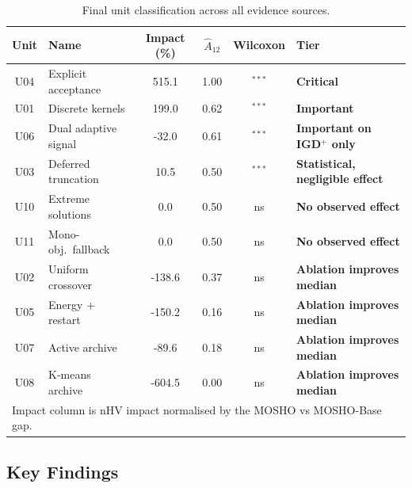 \documentclass[11pt,a4paper]{article}
\begin{document}
\begin{table}[H]
\centering
\caption{Final unit classification across all evidence sources.}
\label{tab:classification}
\renewcommand{\arraystretch}{1.3}
\setlength{\tabcolsep}{5pt}
\small
\begin{tabular}{c l c c c l}
\toprule
\textbf{Unit} & \textbf{Name} &
  \textbf{Impact (\%)} & $\hat{A}_{12}$ &
  \textbf{Wilcoxon} & \textbf{Tier} \\
\midrule
U04 & Explicit acceptance  & 515.1 & 1.00 & $^{***}$ & \textbf{Critical} \\
U01 & Discrete kernels     & 199.0 & 0.62 & $^{***}$ & \textbf{Important} \\
U06 & Dual adaptive signal & -32.0 & 0.61 & $^{***}$ & \textbf{Important on IGD$^+$ only} \\
U03 & Deferred truncation  & 10.5 & 0.50 & $^{***}$ & \textbf{Statistical, negligible effect} \\
U10 & Extreme solutions    & 0.0 & 0.50 & \textsf{ns} & \textbf{No observed effect} \\
U11 & Mono-obj.\ fallback  & 0.0 & 0.50 & \textsf{ns} & \textbf{No observed effect} \\
U02 & Uniform crossover    & -138.6 & 0.37 & \textsf{ns} & \textbf{Ablation improves median} \\
U05 & Energy + restart     & -150.2 & 0.16 & \textsf{ns} & \textbf{Ablation improves median} \\
U07 & Active archive       & -89.6 & 0.18 & \textsf{ns} & \textbf{Ablation improves median} \\
U08 & K-means archive      & -604.5 & 0.00 & \textsf{ns} & \textbf{Ablation improves median} \\
\bottomrule
\multicolumn{6}{l}{Impact column is nHV impact normalised by the MOSHO vs MOSHO-Base gap.} \\
\end{tabular}
\end{table}

\subsection{Key Findings}
\label{sec:interp_findings}
\end{document}
